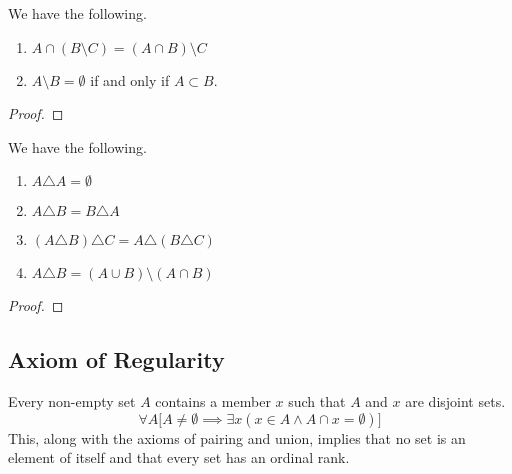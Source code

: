   \begin{theorem}
    We have the following. 
    \begin{enumerate}
      \item $A \cap (B \setminus C) = (A \cap B) \setminus C$ 
      \item $A \setminus B = \emptyset$ if and only if $A \subset B$. 
    \end{enumerate}
  \end{theorem}
  \begin{proof}
    
  \end{proof} 

  \begin{theorem}
    We have the following. 
    \begin{enumerate}
      \item $A \triangle A = \emptyset$
      \item $A \triangle B = B \triangle A$
      \item $(A \triangle B) \triangle C = A \triangle (B \triangle C)$
      \item $A \triangle B = (A \cup B) \setminus (A \cap B)$
    \end{enumerate}
  \end{theorem}
  \begin{proof}
    
  \end{proof} 

\subsection{Axiom of Regularity} 

  \begin{axiom}
    Every non-empty set $A$ contains a member $x$ such that $A$ and $x$ are disjoint sets. 
    \begin{equation}
      \forall A \big[ A \neq \emptyset \implies \exists x (x \in A \land A \cap x = \emptyset) \big]
    \end{equation}
    This, along with the axioms of pairing and union, implies that no set is an element of itself and that every set has an ordinal rank. 
  \end{axiom}

